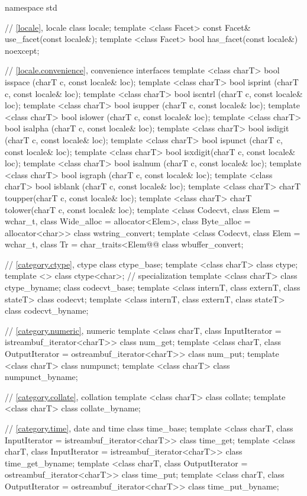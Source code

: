 %
\begin{codeblock}
namespace std {
  // \ref{locale}, locale
  class locale;
  template <class Facet> const Facet& use_facet(const locale&);
  template <class Facet> bool         has_facet(const locale&) noexcept;

  // \ref{locale.convenience}, convenience interfaces
  template <class charT> bool isspace (charT c, const locale& loc);
  template <class charT> bool isprint (charT c, const locale& loc);
  template <class charT> bool iscntrl (charT c, const locale& loc);
  template <class charT> bool isupper (charT c, const locale& loc);
  template <class charT> bool islower (charT c, const locale& loc);
  template <class charT> bool isalpha (charT c, const locale& loc);
  template <class charT> bool isdigit (charT c, const locale& loc);
  template <class charT> bool ispunct (charT c, const locale& loc);
  template <class charT> bool isxdigit(charT c, const locale& loc);
  template <class charT> bool isalnum (charT c, const locale& loc);
  template <class charT> bool isgraph (charT c, const locale& loc);
  template <class charT> bool isblank (charT c, const locale& loc);
  template <class charT> charT toupper(charT c, const locale& loc);
  template <class charT> charT tolower(charT c, const locale& loc);
  template <class Codecvt, class Elem = wchar_t,
    class Wide_alloc = allocator<Elem>,
    class Byte_alloc = allocator<char>> class wstring_convert;
  template <class Codecvt, class Elem = wchar_t,
     class Tr = char_traits<Elem@\shr{}@ class wbuffer_convert;

  // \ref{category.ctype}, ctype
  class ctype_base;
  template <class charT> class ctype;
  template <>            class ctype<char>;             // specialization
  template <class charT> class ctype_byname;
  class codecvt_base;
  template <class internT, class externT, class stateT> class codecvt;
  template <class internT, class externT, class stateT> class codecvt_byname;

  // \ref{category.numeric}, numeric
  template <class charT, class InputIterator = istreambuf_iterator<charT>>  class num_get;
  template <class charT, class OutputIterator = ostreambuf_iterator<charT>> class num_put;
  template <class charT> class numpunct;
  template <class charT> class numpunct_byname;

  // \ref{category.collate}, collation
  template <class charT> class collate;
  template <class charT> class collate_byname;

  // \ref{category.time}, date and time
  class time_base;
  template <class charT, class InputIterator = istreambuf_iterator<charT>>
    class time_get;
  template <class charT, class InputIterator = istreambuf_iterator<charT>>
    class time_get_byname;
  template <class charT, class OutputIterator = ostreambuf_iterator<charT>>
    class time_put;
  template <class charT, class OutputIterator = ostreambuf_iterator<charT>>
    class time_put_byname;

}
\end{codeblock}
